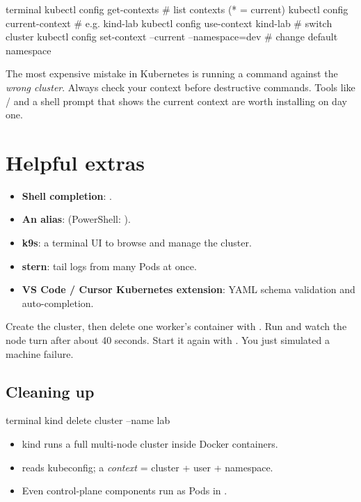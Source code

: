 \begin{bashcode}{terminal}
kubectl config get-contexts           # list contexts (* = current)
kubectl config current-context        # e.g. kind-lab
kubectl config use-context kind-lab   # switch cluster
kubectl config set-context --current --namespace=dev   # change default namespace
\end{bashcode}

\begin{warningbox}
The most expensive mistake in Kubernetes is running a command against the
\emph{wrong cluster}. Always check your context before destructive commands.
Tools like / and a shell prompt that shows the current
context are worth installing on day one.
\end{warningbox}

\section{Helpful extras}

\begin{itemize}
  \item \textbf{Shell completion}: .
  \item \textbf{An alias}:  (PowerShell:
        ).
  \item \textbf{k9s}: a terminal UI to browse and manage the cluster.
  \item \textbf{stern}: tail logs from many Pods at once.
  \item \textbf{VS Code / Cursor Kubernetes extension}: YAML schema validation
        and auto-completion.
\end{itemize}

\begin{tryit}
Create the  cluster, then delete one worker's container with
. Run  and watch the node
turn  after about 40 seconds. Start it again with
. You just simulated a machine failure.
\end{tryit}

\subsection*{Cleaning up}

\begin{bashcode}{terminal}
kind delete cluster --name lab
\end{bashcode}

\begin{recap}
\begin{itemize}
  \item kind runs a full multi-node cluster inside Docker containers.
  \item {} reads kubeconfig; a \emph{context} = cluster + user + namespace.
  \item Even control-plane components run as Pods in .
\end{itemize}
\end{recap}

